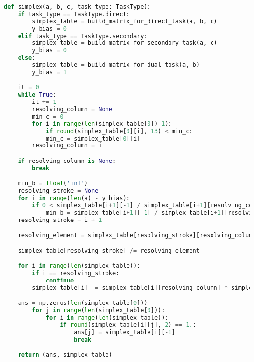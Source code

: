\documentclass[a4paper, 14pt]{extarticle}
\begin{document}
\begin{lstlisting}[language=python]
def simplex(a, b, c, task_type: TaskType):
	if task_type == TaskType.direct:
		simplex_table = build_matrix_for_direct_task(a, b, c)
		y_bias = 0
	elif task_type == TaskType.secondary:
		simplex_table = build_matrix_for_secondary_task(a, c)
		y_bias = 0
	else:
		simplex_table = build_matrix_for_dual_task(a, b)
		y_bias = 1

	it = 0
	while True:
		it += 1
		resolving_column = None
		min_c = 0
		for i in range(len(simplex_table[0])-1):
			if round(simplex_table[0][i], 13) < min_c:
			min_c = simplex_table[0][i]
		resolving_column = i

	if resolving_column is None:
		break

	min_b = float('inf')
	resolving_stroke = None
	for i in range(len(a) - y_bias):
		if 0 < simplex_table[i+1][-1] / simplex_table[i+1][resolving_column] < min_b:
			min_b = simplex_table[i+1][-1] / simplex_table[i+1][resolving_column]
	resolving_stroke = i + 1

	resolving_element = simplex_table[resolving_stroke][resolving_column]

	simplex_table[resolving_stroke] /= resolving_element

	for i in range(len(simplex_table)):
		if i == resolving_stroke:
			continue
		simplex_table[i] -= simplex_table[i][resolving_column] * simplex_table[resolving_stroke]

	ans = np.zeros(len(simplex_table[0]))
		for j in range(len(simplex_table[0])):
			for i in range(len(simplex_table)):
				if round(simplex_table[i][j], 2) == 1.:
					ans[j] = simplex_table[i][-1]
					break

	return (ans, simplex_table)
 	\end{lstlisting}
		  
\end{document}
